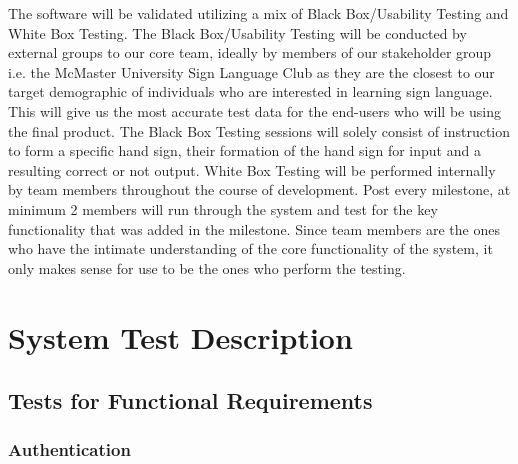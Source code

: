 \documentclass[12pt, titlepage]{article}
\begin{document}
The software will be validated utilizing a mix of Black Box/Usability Testing and White Box Testing. The Black Box/Usability Testing will be conducted by external groups to our core team, ideally by members of our stakeholder group i.e. the McMaster University Sign Language Club as they are the closest to our target demographic of individuals who are interested in learning sign language. This will give us the most accurate test data for the end-users who will be using the final product. The Black Box Testing sessions will solely consist of instruction to form a specific hand sign, their formation of the hand sign for input and a resulting correct or not output. \newline 
\indent White Box Testing will be performed internally by team members throughout the course of development. Post every milestone, at minimum 2 members will run through the system and test for the key functionality that was added in the milestone. Since team members are the ones who have the intimate understanding of the core functionality of the system, it only makes sense for use to be the ones who perform the testing.

\section{System Test Description}
	
\subsection{Tests for Functional Requirements}



\subsubsection{Authentication}

		
\end{document}
